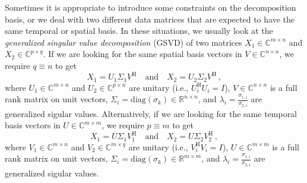 \documentclass[10pt]{article}
\begin{document}
Sometimes it is appropriate to introduce some constraints on the decomposition basis, or we deal with two different data matrices that are expected to have the same temporal or spatial basis.
In these situations, we usually look at the {\em generalized singular value decomposition} (GSVD) of two matrices $X_1\in \mathbb{C}^{m\times n}$ and $X_2 \in \mathbb{C}^{p\times q}$.
If we are looking for the same spatial basis vectors in $V\in \mathbb{C}^{n\times n}$, we require  $q \equiv n$ to get 
\begin{equation}\label{GSVD}
    X_1 = U_1 \Sigma_{1} V^\mathrm{H} \quad \mathrm{and} \quad  X_2 = U_2 \Sigma_{2} V^\mathrm{H}\,,
\end{equation}
where $U_1\in \mathbb{C}^{m\times n}$ and $U_2\in \mathbb{C}^{p\times n}$ are unitary (i.e., $U_i^\mathrm{H} U_i = I$), $V\in\mathbb{C}^{n\times n}$ is a full rank matrix on unit vectors, $\Sigma_{i} = \mathrm{diag}(\sigma_k) \in \mathbb{R}^{n\times n}$, and $\lambda_{i} = \frac{\sigma_{1,i}}{\sigma_{2,i}}$ are generalized sigular values.
Alternatively, if we are looking for the same temporal basis vectors in $U\in \mathbb{C}^{m\times m}$, we require  $p \equiv m$ to get 
\begin{equation}\label{GSVD1}
    X_1 = U \Sigma_{1} V_1^\mathrm{H} \quad \mathrm{and} \quad  X_2 = U \Sigma_{2} V_2^\mathrm{H}\,,
\end{equation}
where $V_1\in \mathbb{C}^{m\times n}$ and $V_2\in \mathbb{C}^{m\times q}$ are unitary (i.e., $V_i^\mathrm{H} V_i = I$), $U\in\mathbb{C}^{m\times m}$ is a full rank matrix on unit vectors, $\Sigma_{i} = \mathrm{diag}(\sigma_k) \in \mathbb{R}^{m\times m}$, and $\lambda_{i} = \frac{\sigma_{1,i}}{\sigma_{2,i}}$ are generalized sigular values.

\end{document}
